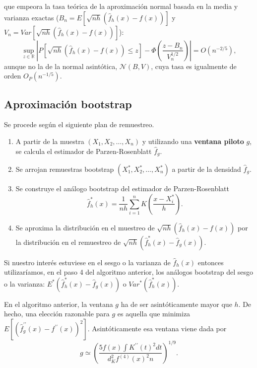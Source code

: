 \documentclass[
]{book}
\theoremstyle{break}
\theoremstyle{nonumberplain}
\begin{document}
que empeora la tasa teórica de la aproximación normal basada en la media
y varianza exactas (\(B_n=E\left[ \sqrt{nh}\left( \hat{f}_{h}\left(
x \right) -f\left( x \right) \right) \right]\) y
\(V_n=Var\left[ \sqrt{nh} \left( \hat{f}_{h}\left( x \right) -f\left( x \right) \right) \right]\)):
\[\sup_{z\in \mathbb{R}}\left\vert P\left[ \sqrt{nh}\left( \hat{f}
_{h}\left( x \right) -f\left( x \right) \right) \leq z\right] -\Phi \left( 
\frac{z-B_n}{V_n^{1/2}} \right) \right\vert =O\left( n^{-2/5} \right),\]
aunque no la de la normal asintótica, \(\mathcal{N}\left( B,V \right)\), cuya tasa es
igualmente de orden \(O_{P}\left( n^{-1/5} \right)\).

\subsection{Aproximación bootstrap}\label{aproximaciuxf3n-bootstrap}

Se procede según el siguiente plan de remuestreo.

\begin{enumerate}
\def\labelenumi{\arabic{enumi}.}
\item
  A partir de la muestra \(\left( X_1,X_2,\ldots ,X_n \right)\) y
  utilizando una \textbf{ventana piloto} \(g\), se calcula el estimador de
  Parzen-Rosenblatt \(\hat{f}_{g}\).
\item
  Se arrojan remuestras bootstrap \(\left( X_1^{\ast},X_2^{\ast
  },\ldots ,X_n^{\ast} \right)\) a partir de la densidad
  \(\hat{f}_{g}\).
\item
  Se construye el análogo bootstrap del estimador de Parzen-Rosenblatt
  \[\hat{f}_{h}^{\ast}\left( x \right) =\frac{1}{nh}\sum_{i=1}^{n}K\left( \frac{
  x-X_i^{\ast}}{h} \right).\]
\item
  Se aproxima la distribución en el muestreo de \(\sqrt{nh}\left(
  \hat{f}_{h}\left( x \right) -f\left( x \right) \right)\) por la
  distribución en el remuestreo de
  \(\sqrt{nh}\left( \hat{f}_{h}^{\ast}\left( x \right) -
  \hat{f}_{g}\left( x \right) \right)\).
\end{enumerate}

Si nuestro interés estuviese en el sesgo o la varianza de \(\hat{f}
_{h}\left( x \right)\) entonces utilizaríamos, en el paso 4 del algoritmo
anterior, los análogos bootstrap del sesgo o la varianza:
\(E^{\ast}\left( \hat{f}_{h}^{\ast
}\left( x \right) -\hat{f}_{g}\left( x \right) \right)\) o
\(Var^{\ast}\left(
\hat{f}_{h}^{\ast}\left( x \right) \right)\).

En el algoritmo anterior, la ventana \(g\) ha de ser asintóticamente mayor
que \(h\). De hecho, una elección razonable para \(g\) es aquella que
minimiza \(E\left[ \left( \hat{f}_{g}^{\prime \prime }\left( x \right)
-f^{\prime \prime }\left( x \right) \right)^2\right]\).
Asintóticamente esa ventana viene dada por
\[g\simeq \left( \frac{5f\left( x \right) \int K^{\prime \prime }\left( t
\right)^2dt}{d_{K}^2f^{\left( 4 \right)}\left( x \right)^2n} \right)^{1/9}.\]
\end{document}
